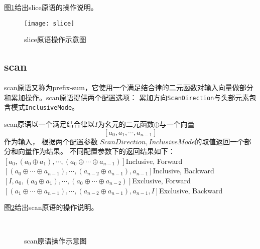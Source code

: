 图\ref{fig:slice-diagram}给出slice原语的操作说明。
\begin{figure}[h]
  \centering
  \texttt{[image: slice]}
  \caption{slice原语操作示意图}
  \label{fig:slice-diagram}
\end{figure}

\subsection{scan}
scan原语又称为prefix-sum，它使用一个满足结合律的二元函数对输入向量做部分和累加操作。scan原语提供两个配置选项：
累加方向\texttt{ScanDirection}与头部元素包含模式\texttt{InclusiveMode}。
\begin{definition}
  scan原语以一个满足结合律以$I$为幺元的二元函数$\oplus$与一个向量$$[a_0, a_1, \cdots, a_{n-1}]$$作为输入，
  根据两个配置参数  $ScanDirection, InclusiveMode$的取值返回一个部分和向量作为结果。
  不同配置参数下的返回结果如下：\\
  $[a_0, (a_0\oplus{}a_1), \cdots, (a_0\oplus{}\cdots\oplus{}a_{n-1})]$\hfill{}Inclusive, Forward\\
  $[(a_0\oplus\cdots\oplus{}a_{n-1}), \cdots, (a_{n-2}\oplus{}a_{n-1}), a_{n-1}]$\hfill{}Inclusive, Backward\\
  $[I, a_0, (a_0\oplus{}a_1), \cdots, (a_0\oplus{}\cdots\oplus{}a_{n-2})]$\hfill{}Exclusive, Forward\\
  $[(a_1\oplus\cdots\oplus{}a_{n-1}), \cdots, (a_{n-2}\oplus{}a_{n-1}), a_{n-1}, I]$\hfill{}Exclusive, Backward\\
\end{definition}

图\ref{fig:scan-diagram}给出scan原语的操作说明。
\begin{figure}[h]
  \centering
  \\
  \caption{scan原语操作示意图}
  \label{fig:scan-diagram}
\end{figure}


